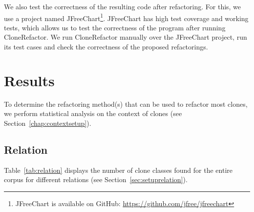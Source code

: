 \documentclass[runningheads]{llncs}
\begin{document}
We also test the correctness of the resulting code after refactoring. For this, we use a project named JFreeChart\footnote{JFreeChart is available on GitHub: \url{https://github.com/jfree/jfreechart}}. JFreeChart has high test coverage and working tests, which allows us to test the correctness of the program after running CloneRefactor. We run CloneRefactor manually over the JFreeChart project, run its test cases and check the correctness of the proposed refactorings.

\section{Results}
To determine the refactoring method(s) that can be used to refactor most clones, we perform statistical analysis on the context of clones (see Section~\ref{chap:contextsetup}).

\subsection{Relation} \label{sec:relationresults}
Table~\ref{tab:relation} displays the number of clone classes found for the entire corpus for different relations (see Section~\ref{sec:setuprelation}).
\end{document}
